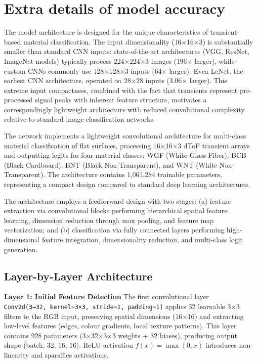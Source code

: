 \documentclass[12pt,a4paper,oneside]{report}
\let\oldsection\section
\renewcommand{\section}{\clearpage\oldsection}
\begin{document}
\section{Extra details of model accuracy}
\label{sec:extra_details_of_model_accuracy}

The model architecture is designed for the unique characteristics of transient-based material classification. The input dimensionality (16×16×3) is substantially smaller than standard CNN inputs: state-of-the-art architectures (VGG, ResNet, ImageNet models) typically process 224×224×3 images (196× larger), while custom CNNs commonly use 128×128×3 inputs (64× larger). Even LeNet, the earliest CNN architecture, operated on 28×28 inputs (3.06× larger). This extreme input compactness, combined with the fact that transients represent pre-processed signal peaks with inherent feature structure, motivates a correspondingly lightweight architecture with reduced convolutional complexity relative to standard image classification networks.

The network implements a lightweight convolutional architecture for multi-class material classification of flat surfaces, processing 16×16×3 dToF transient arrays and outputting logits for four material classes: WGF (White Glass Fiber), BCB (Black Cardboard), BNT (Black Non-Transparent), and WNT (White Non-Transparent). The architecture contains 1,061,284 trainable parameters, representing a compact design compared to standard deep learning architectures.

The architecture employs a feedforward design with two stages: (a) feature extraction via convolutional blocks performing hierarchical spatial feature learning, dimension reduction through max pooling, and feature map vectorization; and (b) classification via fully connected layers performing high-dimensional feature integration, dimensionality reduction, and multi-class logit generation.

\subsection{Layer-by-Layer Architecture}

\textbf{Layer 1: Initial Feature Detection}
The first convolutional layer \texttt{Conv2d(3→32, kernel=3×3, stride=1, padding=1)} applies 32 learnable 3×3 filters to the RGB input, preserving spatial dimensions (16×16) and extracting low-level features (edges, colour gradients, local texture patterns). This layer contains 928 parameters (3×32×3×3 weights + 32 biases), producing output shape (batch, 32, 16, 16). ReLU activation $f(x) = \max(0, x)$ introduces non-linearity and sparsifies activations.
\end{document}
